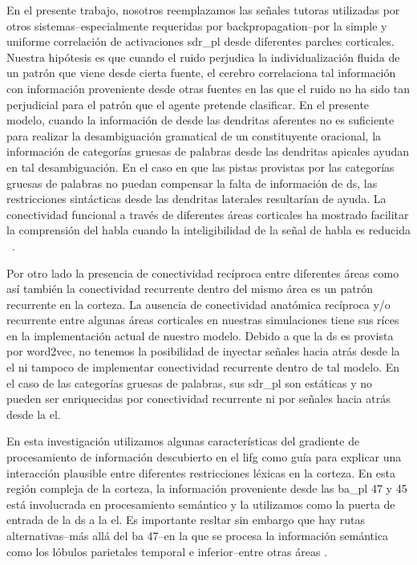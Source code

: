 {En el presente trabajo, nosotros reemplazamos las señales tutoras utilizadas por otros sistemas--especialmente requeridas por backpropagation--por la simple y uniforme correlación de activaciones \gls{sdr_pl} desde diferentes parches corticales.
Nuestra hipótesis es que cuando el ruido perjudica la individualización fluida de un patrón que viene desde cierta fuente, el cerebro correlaciona tal información con información proveniente desde otras fuentes en las que el ruido no ha sido tan perjudicial para el patrón que el agente pretende clasificar.
En el presente modelo, cuando la información de  desde las dendritas aferentes no es suficiente para realizar la desambiguación gramatical de un constituyente oracional, la información de categorías gruesas de palabras desde las dendritas apicales ayudan en tal desambiguación.
En el caso en que las pistas provistas por las categorías gruesas de palabras no puedan compensar la falta de información de \gls{ds}, las restricciones sintácticas desde las dendritas laterales resultarían de ayuda.
La conectividad funcional a través de diferentes áreas corticales ha mostrado facilitar la comprensión del habla cuando la inteligibilidad de la señal de habla es reducida ~\cite{Obleser2283}.

Por otro lado la presencia de conectividad recíproca entre diferentes áreas como así también la conectividad recurrente dentro del mismo área es un patrón recurrente en la corteza.
La ausencia de conectividad anatómica recíproca y/o recurrente entre algunas áreas corticales en nuestras simulaciones tiene sus ríces en la implementación actual de nuestro modelo.
Debido a que la \gls{ds} es provista por word2vec, no tenemos la posibilidad de inyectar señales hacia atrás desde la \gls{el} ni tampoco de implementar conectividad recurrente dentro de tal modelo.
En el caso de las categorías gruesas de palabras, sus \gls{sdr_pl} son estáticas y no pueden ser enriquecidas por conectividad recurrente ni por señales hacia atrás desde la \gls{el}.

En esta investigación utilizamos algunas características del gradiente de procesamiento de información descubierto en el \gls{lifg} como guía para explicar una interacción plausible entre diferentes restricciones léxicas en la corteza.
En esta región compleja de la corteza, la información proveniente desde las \gls{ba_pl} 47 y 45 está involucrada en procesamiento semántico \cite{GOUCHA2015294, DECARLI2007933, PMID:15528098, NEWMAN201051} y la utilizamos como la puerta de entrada de la \gls{ds} a la \gls{el}.
Es importante resltar sin embargo que hay rutas alternativas--más allá del \gls{ba} 47--en la que se procesa la información semántica
como los lóbulos parietales temporal e inferior--entre otras áreas \cite{Binder2011TheNO}.

}
